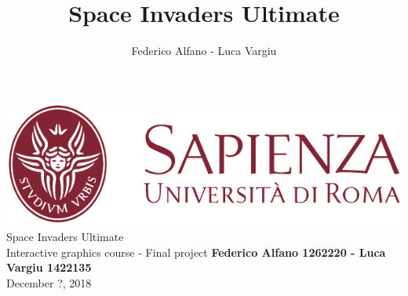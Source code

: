 \documentclass{article}
\title{Space Invaders Ultimate}
\author{Federico Alfano - Luca Vargiu}
\begin{document}
\begin{titlepage}
\centering
\includegraphics[scale=1]{images/logo.pdf}\\
\vspace{4.5 cm}
\huge Space Invaders Ultimate\\
\vspace{1.2 cm}
\large Interactive graphics course - Final project
\vfill
\large \textbf{Federico Alfano 1262220 - Luca Vargiu 1422135}\\
\vspace{2 cm}
\large December ?, 2018
\end{titlepage}






\end{document}
